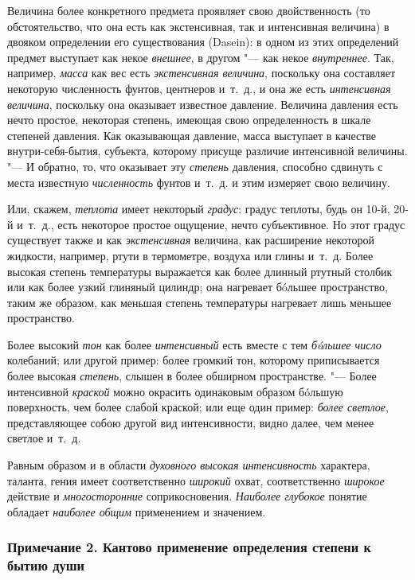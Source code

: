 Величина более конкретного предмета проявляет свою двойственность (то
обстоятельство, что она есть как экстенсивная, так и интенсивная величина)
в двояком определении его существования (Dasein): в одном из этих
определений предмет выступает как некое {\em внешнее},
в другом "--- как некое {\em внутреннее}. Так, например,
{\em масса} как вес есть
{\em экстенсивная величина}, поскольку она составляет
некоторую численность фунтов, центнеров и~т.~д., и она же есть
{\em интенсивная величина}, поскольку она оказывает
известное давление. Величина давления есть нечто простое, некоторая
степень, имеющая свою определенность в шкале степеней давления. Как
оказывающая давление, масса выступает в качестве внутри-себя-бытия,
субъекта, которому присуще различие интенсивной величины. "--- И обратно, то,
что оказывает эту {\em степень} давления, способно
сдвинуть с места известную {\em численность} фунтов
и~т.~д. и этим измеряет свою величину.

Или, скажем, {\em теплота} имеет некоторый
{\em градус}: градус теплоты, будь он 10-й, 20-й
и~т.~д., есть некоторое простое ощущение, нечто субъективное. Но этот
градус существует также и как {\em экстенсивная}
величина, как расширение некоторой жидкости, например, ртути в термометре,
воздуха или глины и~т.~д. Более высокая степень температуры выражается как
более длинный ртутный столбик или как более узкий глиняный цилиндр; она
нагревает бóльшее пространство, таким же образом, как меньшая степень
температуры нагревает лишь меньшее пространство.

Более высокий {\em тон} как более
{\em интенсивный} есть вместе с тем
{\em бóльшее число} колебаний; или другой пример: более
громкий тон, которому приписывается более высокая
{\em степень}, слышен в более обширном пространстве. "---
Более интенсивной {\em краской} можно окрасить
одинаковым образом бóльшую поверхность, чем более слабой краской; или еще
один пример: {\em более светлое}, представляющее собою
другой вид интенсивности, видно далее, чем менее светлое и~т.~д.

Равным образом и в области {\em духовного высокая
интенсивность} характера, таланта, гения имеет соответственно
{\em широкий} охват, соответственно
{\em широкое} действие и
{\em многосторонние} соприкосновения.
{\em Наиболее глубокое} понятие обладает
{\em наиболее общим} применением и значением.


\subsubsection[Примечание 2. Кантово применение определения степени к бытию души]
{Примечание 2. Кантово применение определения степени к бытию души}

